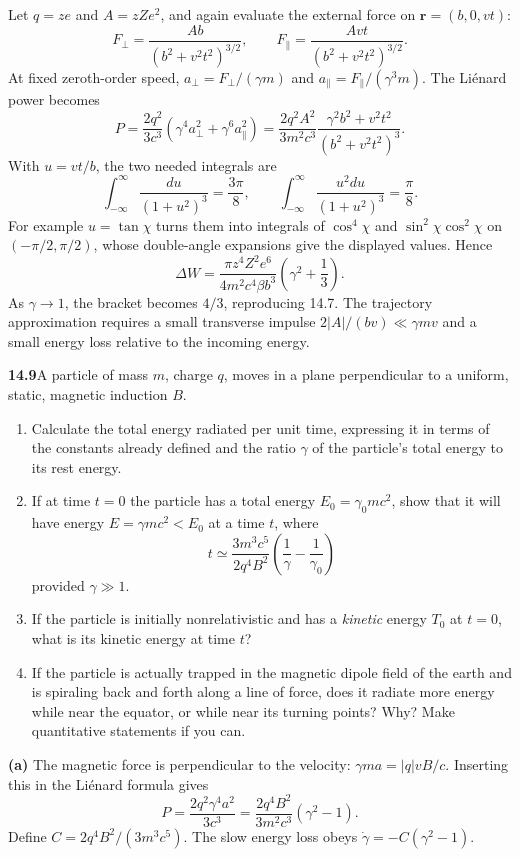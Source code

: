 Let $q=ze$ and $A=zZe^2$, and again evaluate the external force on
$\mathbf r=(b,0,vt)$:
\[
F_\perp=\frac{Ab}{(b^2+v^2t^2)^{3/2}},\qquad
F_\parallel=\frac{Avt}{(b^2+v^2t^2)^{3/2}}.
\]
At fixed zeroth-order speed, $a_\perp=F_\perp/(\gamma m)$ and
$a_\parallel=F_\parallel/(\gamma^3m)$. The Li\'enard power becomes
\[
P=\frac{2q^2}{3c^3}(\gamma^4a_\perp^2+\gamma^6a_\parallel^2)
=\frac{2q^2A^2}{3m^2c^3}
\frac{\gamma^2b^2+v^2t^2}{(b^2+v^2t^2)^3}.
\]
With $u=vt/b$, the two needed integrals are
\[
\int_{-\infty}^\infty\frac{du}{(1+u^2)^3}=\frac{3\pi}{8},\qquad
\int_{-\infty}^\infty\frac{u^2du}{(1+u^2)^3}=\frac\pi8.
\]
For example $u=\tan\chi$ turns them into integrals of $\cos^4\chi$
and $\sin^2\chi\cos^2\chi$ on $(-\pi/2,\pi/2)$, whose double-angle
expansions give the displayed values. Hence
\[
\boxed{\Delta W=\frac{\pi z^4Z^2e^6}{4m^2c^4\beta b^3}
\left(\gamma^2+\frac13\right).}
\]
As $\gamma\to1$, the bracket becomes $4/3$, reproducing 14.7.
The trajectory approximation requires a small transverse impulse
$2|A|/(bv)\ll\gamma mv$ and a small energy loss relative to the incoming
energy.

\par\bigskip
\noindent\textbf{14.9}\quad A particle of mass $m$, charge $q$, moves in a plane perpendicular to a uniform, static, magnetic induction $B$.
\begin{enumerate}
\item[(a)] Calculate the total energy radiated per unit time, expressing it in terms of the constants already defined and the ratio $\gamma$ of the particle's total energy to its rest energy.
\item[(b)] If at time $t=0$ the particle has a total energy $E_{0}=\gamma_{0}mc^{2}$, show that it will have energy $E=\gamma mc^{2}<E_{0}$ at a time $t$, where
\[
t\simeq\frac{3m^{3}c^{5}}{2q^{4}B^{2}}\left(\frac{1}{\gamma}-\frac{1}{\gamma_{0}}\right)
\]
provided $\gamma\gg1$.
\item[(c)] If the particle is initially nonrelativistic and has a \emph{kinetic} energy $T_{0}$ at $t=0$, what is its kinetic energy at time $t$?
\item[(d)] If the particle is actually trapped in the magnetic dipole field of the earth and is spiraling back and forth along a line of force, does it radiate more energy while near the equator, or while near its turning points? Why? Make quantitative statements if you can.
\end{enumerate}
\solution

\textbf{(a)} The magnetic force is perpendicular to the velocity:
$\gamma m a=|q|vB/c$. Inserting this in the Li\'enard formula gives
\[
\boxed{P=\frac{2q^2\gamma^4a^2}{3c^3}
=\frac{2q^4B^2}{3m^2c^3}(\gamma^2-1).}
\]
Define $C=2q^4B^2/(3m^3c^5)$. The slow energy loss obeys
$\dot\gamma=-C(\gamma^2-1)$.


